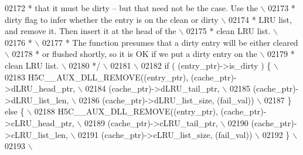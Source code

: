 \begin{DoxyCode}
02172 \textcolor{comment}{     * that it must be dirty -- but that need not be the case.  Use the \(\backslash\)}
02173 \textcolor{comment}{     * dirty flag to infer whether the entry is on the clean or dirty   \(\backslash\)}
02174 \textcolor{comment}{     * LRU list, and remove it.  Then insert it at the head of the      \(\backslash\)}
02175 \textcolor{comment}{     * clean LRU list.                                                  \(\backslash\)}
02176 \textcolor{comment}{         *                                                                  \(\backslash\)}
02177 \textcolor{comment}{         * The function presumes that a dirty entry will be either cleared  \(\backslash\)}
02178 \textcolor{comment}{     * or flushed shortly, so it is OK if we put a dirty entry on the   \(\backslash\)}
02179 \textcolor{comment}{     * clean LRU list.                                                  \(\backslash\)}
02180 \textcolor{comment}{         */}\textcolor{preprocessor}{                                                                 \(\backslash\)}
02181 \textcolor{preprocessor}{                                                                            \(\backslash\)}
02182 \textcolor{preprocessor}{        if ( (entry\_ptr)->is\_dirty ) \{                                      \(\backslash\)}
02183 \textcolor{preprocessor}{            H5C\_\_AUX\_DLL\_REMOVE((entry\_ptr), (cache\_ptr)->dLRU\_head\_ptr,    \(\backslash\)}
02184 \textcolor{preprocessor}{                                (cache\_ptr)->dLRU\_tail\_ptr,                 \(\backslash\)}
02185 \textcolor{preprocessor}{                                (cache\_ptr)->dLRU\_list\_len,                 \(\backslash\)}
02186 \textcolor{preprocessor}{                                (cache\_ptr)->dLRU\_list\_size, (fail\_val))    \(\backslash\)}
02187 \textcolor{preprocessor}{        \} else \{                                                            \(\backslash\)}
02188 \textcolor{preprocessor}{            H5C\_\_AUX\_DLL\_REMOVE((entry\_ptr), (cache\_ptr)->cLRU\_head\_ptr,    \(\backslash\)}
02189 \textcolor{preprocessor}{                                (cache\_ptr)->cLRU\_tail\_ptr,                 \(\backslash\)}
02190 \textcolor{preprocessor}{                                (cache\_ptr)->cLRU\_list\_len,                 \(\backslash\)}
02191 \textcolor{preprocessor}{                                (cache\_ptr)->cLRU\_list\_size, (fail\_val))    \(\backslash\)}
02192 \textcolor{preprocessor}{        \}                                                                   \(\backslash\)}
02193 \textcolor{preprocessor}{                                                                            \(\backslash\)}

\end{DoxyCode}
